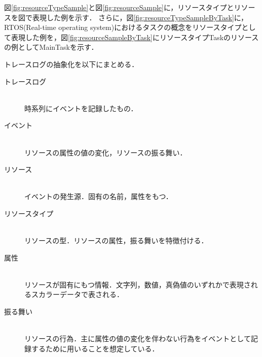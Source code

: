 図\ref{fig:resourceTypeSample}と図\ref{fig:resourceSample}に，リソースタイプとリソースを図で表現した例を示す．
さらに，図\ref{fig:resourceTypeSampleByTask}に，RTOS(Real-time operating system)におけるタスクの概念をリソースタイプとして表現した例を，図\ref{fig:resourceSampleByTask}にリソースタイプTaskのリソースの例としてMainTaskを示す．

トレースログの抽象化を以下にまとめる．

\begin{description}
\item[トレースログ] \mbox{} \\
時系列にイベントを記録したもの．
\item[イベント] \mbox{} \\
リソースの属性の値の変化，リソースの振る舞い．
\item[リソース] \mbox{} \\
イベントの発生源．固有の名前，属性をもつ．
\item[リソースタイプ] \mbox{} \\
リソースの型．リソースの属性，振る舞いを特徴付ける．
\item[属性] \mbox{} \\
リソースが固有にもつ情報．文字列，数値，真偽値のいずれかで表現されるスカラーデータで表される．
\item[振る舞い] \mbox{} \\
リソースの行為．主に属性の値の変化を伴わない行為をイベントとして記録するために用いることを想定している．
\end{description}

